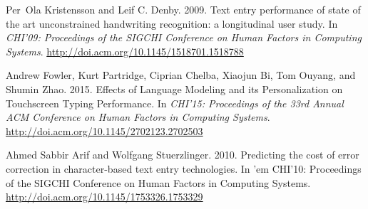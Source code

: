 \documentclass[final,1p,times,authoryear]{elsarticle}
\begin{document}
\begin{thebibliography}{00}
	
{Per~Ola Kristensson} {and} {Leif C. Denby}. 2009.
Text entry performance of state of the art unconstrained handwriting recognition: a longitudinal user study.
In {\em CHI'09: Proceedings of the SIGCHI Conference on Human Factors in Computing Systems}.
\url{http://doi.acm.org/10.1145/1518701.1518788}


{Andrew Fowler}, {Kurt Partridge}, {Ciprian Chelba}, {Xiaojun Bi}, {Tom Ouyang}, {and} {Shumin Zhao}. 2015.
Effects of Language Modeling and its Personalization on Touchscreen Typing Performance.
In {\em CHI'15: Proceedings of the 33rd Annual ACM Conference on Human Factors in Computing Systems}.
\url{http://doi.acm.org/10.1145/2702123.2702503}


{Ahmed Sabbir Arif} {and} {Wolfgang Stuerzlinger}. 2010.
Predicting the cost of error correction in character-based text entry technologies.
In {'em CHI'10: Proceedings of the SIGCHI Conference on Human Factors in Computing Systems}.
\url{http://doi.acm.org/10.1145/1753326.1753329}


\end{thebibliography}
\end{document}
